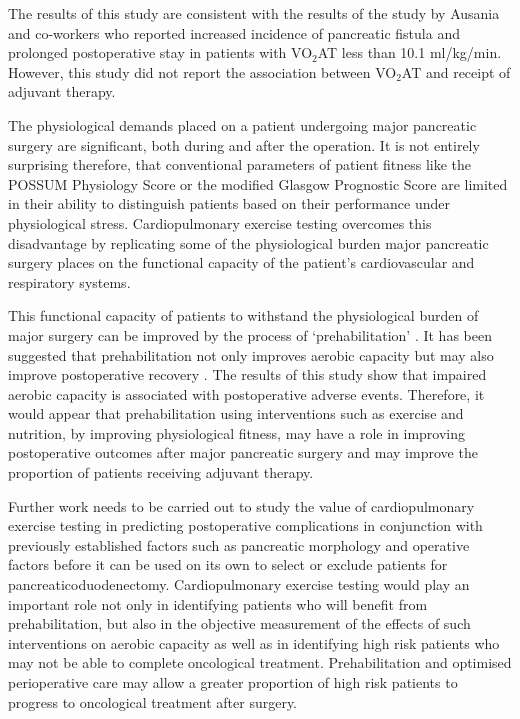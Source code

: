 The results of this study are consistent with the results of the study by Ausania and co-workers \parencite{ausania_effects_2012} who reported increased incidence of pancreatic fistula and prolonged postoperative stay in patients with VO$_2$AT less than 10.1 ml/kg/min. 
However, this study did not report the association between VO$_2$AT and receipt of adjuvant therapy.

The physiological demands placed on a patient undergoing major pancreatic surgery are significant, both during and after the operation. 
It is not entirely surprising therefore, that conventional parameters of patient fitness like the POSSUM Physiology Score or the modified Glasgow Prognostic Score are limited in their ability to distinguish patients based on their performance under physiological stress. 
Cardiopulmonary exercise testing overcomes this disadvantage by replicating some of the physiological burden major pancreatic surgery places on the functional capacity of the patient's cardiovascular and respiratory systems.

This functional capacity of patients to withstand the physiological burden of major surgery can be improved by the process of ‘prehabilitation’ \parencite{topp_effect_2002}. 
It has been suggested that prehabilitation not only improves aerobic capacity \parencite{jones_effects_2007} but may also improve postoperative recovery \parencite{mayo_impact_2011, pehlivan_effects_2011}. 
The results of this study show that impaired aerobic capacity is associated with postoperative adverse events. 
Therefore, it would appear that prehabilitation using interventions such as exercise and nutrition, by improving physiological fitness, may have a role in improving postoperative outcomes after major pancreatic surgery and may improve the proportion of patients receiving adjuvant therapy.

Further work needs to be carried out to study the value of cardiopulmonary exercise testing in predicting postoperative complications in conjunction with previously established factors such as pancreatic morphology and operative factors before it can be used on its own to select or exclude patients for pancreaticoduodenectomy. 
Cardiopulmonary exercise testing would play an important role not only in identifying patients who will benefit from prehabilitation, but also in the objective measurement of the effects of such interventions on aerobic capacity as well as in identifying high risk patients who may not be able to complete oncological treatment. 
Prehabilitation and optimised perioperative care may allow a greater proportion of high risk patients to progress to oncological treatment after surgery.
